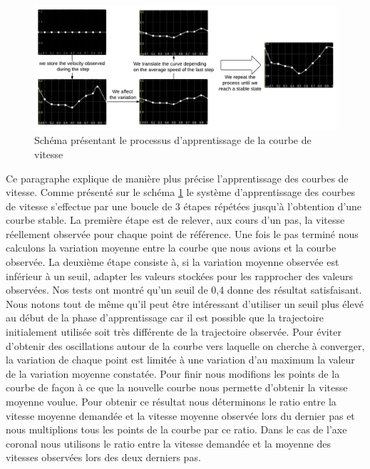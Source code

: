 \documentclass[runningheads,a4paper]{llncs}
\begin{document}
\begin{figure}[h]
\centering
\includegraphics[scale=0.45]{speed_curve_learner.pdf}
\caption{Schéma présentant le processus d'apprentissage de la courbe de vitesse}
\label{fig:speed_curve_learner}
\end{figure}


Ce paragraphe explique de manière plus précise l'apprentissage des courbes de vitesse. Comme présenté sur le schéma \ref{fig:speed_curve_learner} le système d'apprentissage des courbes de vitesse s'effectue par une boucle de 3 étapes répétées jusqu'à l'obtention d'une courbe stable. La première étape est de relever, aux cours d'un pas, la vitesse réellement observée pour chaque point de référence. Une fois le pas terminé nous calculons la variation moyenne entre la courbe que nous avions et la courbe observée. La deuxième étape consiste à, si la variation moyenne observée est inférieur à un seuil, adapter les valeurs stockées pour les rapprocher des valeurs observées. Nos tests ont montré qu'un seuil de 0,4 donne des résultat satisfaisant. Nous notons tout de même qu'il peut être intéressant d'utiliser un seuil plus élevé au début de la phase d'apprentissage car il est possible que la trajectoire initialement utilisée soit très différente de la trajectoire observée.  Pour éviter d'obtenir des oscillations autour de la courbe vers laquelle on cherche à converger, la variation de chaque point est limitée à une variation d'au maximum la valeur de la variation moyenne constatée. Pour finir nous modifions les points de la courbe de façon à ce que la nouvelle courbe nous permette d'obtenir la vitesse moyenne voulue. Pour obtenir ce résultat nous déterminons le ratio entre la vitesse moyenne demandée et la vitesse moyenne observée lors du dernier pas et nous multiplions tous les points de la courbe par ce ratio. Dans le cas de l'axe coronal nous utilisons le ratio entre la vitesse demandée et la moyenne des vitesses observées lors des deux derniers pas.
\end{document}
